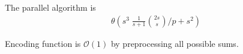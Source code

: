 \begin{frame}
	
	The parallel algorithm is 
	\begin{align*}
		\mathcal{\theta}\left(s^3 \; \frac{1}{s+1} \binom{2s}{s} \bigg/ p + s^2 \right)
	\end{align*}
\end{frame}

\begin{frame}
	
	Encoding function is $\mathcal{O}(1)$ by preprocessing all possible sums.
\end{frame}